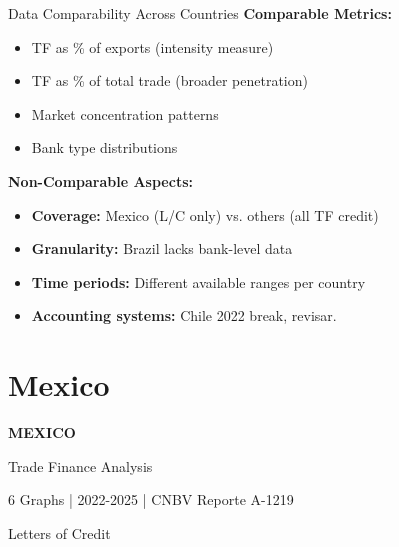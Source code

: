 \documentclass[aspectratio=169,11pt]{beamer}
\begin{document}
\begin{frame}{Data Comparability Across Countries}
\textbf{Comparable Metrics:}
\begin{itemize}
    \item TF as \% of exports (intensity measure)
    \item TF as \% of total trade (broader penetration)
    \item Market concentration patterns
    \item Bank type distributions
\end{itemize}

\vspace{0.3cm}
\textbf{Non-Comparable Aspects:}
\begin{itemize}
    \item \textbf{Coverage:} Mexico (L/C only) vs. others (all TF credit)
    \item \textbf{Granularity:} Brazil lacks bank-level data
    \item \textbf{Time periods:} Different available ranges per country
    \item \textbf{Accounting systems:} Chile 2022 break, revisar.
\end{itemize}

\end{frame}


\section{Mexico}

\begin{frame}
\begin{center}
\vspace{2cm}
{\Huge \textbf{MEXICO}}

\vspace{0.5cm}
{\Large Trade Finance Analysis}

\vspace{1cm}
\large
6 Graphs | 2022-2025 | CNBV Reporte A-1219

\vspace{0.3cm}
\normalsize
Letters of Credit
\end{center}
\end{frame}
\end{document}
